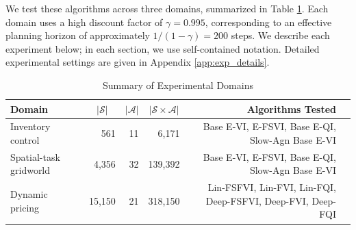 \documentclass[11pt, notitlepage]{article}
\newcommand{\1}{\mathbbm{1}}
\begin{document}
We test these algorithms across three domains, summarized in Table \ref{tab:domains}. Each domain uses a high discount factor of $\gamma = 0.995$, corresponding to an effective planning horizon of approximately $1/(1 - \gamma) = 200$ steps. We describe each experiment below; in each section, we use self-contained notation. Detailed experimental settings are given in Appendix \ref{app:exp_details}.


\renewcommand{\arraystretch}{1.5}  %

\begin{table}[h]
\small
\vspace{10pt}
\centering
\caption{Summary of Experimental Domains}
\label{tab:domains}
\begin{tabular}{@{}lrrrrl@{}}
\toprule
Domain & \multicolumn{1}{c}{$|\mathcal{S}|$} & \multicolumn{1}{c}{$|\mathcal{A}|$} & \multicolumn{1}{c}{$|\mathcal{S} \times \mathcal{A}|$} & Algorithms Tested \\
\midrule
Inventory control        & 561     & 11  & 6{,}171      & Base E-VI, E-FSVI, Base E-QI, Slow-Agn Base E-VI \vspace{5pt}\\
Spatial-task gridworld   & 4{,}356 & 32  & 139{,}392    & Base E-VI, E-FSVI, Base E-QI, Slow-Agn Base E-VI \vspace{5pt}\\ 
Dynamic pricing          & 15{,}150 & 21  & 318{,}150    & \makecell[r]{Lin-FSFVI, Lin-FVI, Lin-FQI,\\Deep-FSFVI, Deep-FVI, Deep-FQI} \\
\bottomrule
\end{tabular}
\end{table}
\end{document}
